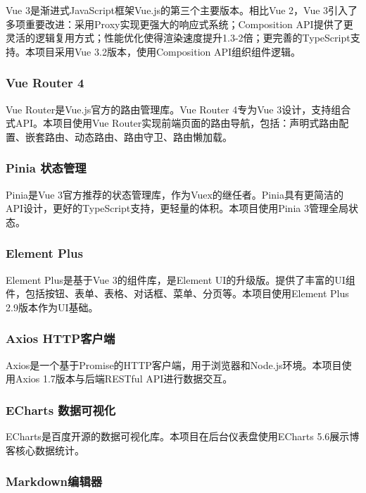 \documentclass[12pt,a4paper]{article}
\begin{document}
Vue 3是渐进式JavaScript框架Vue.js的第三个主要版本。相比Vue 2，Vue 3引入了多项重要改进：采用Proxy实现更强大的响应式系统；Composition API提供了更灵活的逻辑复用方式；性能优化使得渲染速度提升1.3-2倍；更完善的TypeScript支持。本项目采用Vue 3.2版本，使用Composition API组织组件逻辑。

\subsubsection{Vue Router 4}

Vue Router是Vue.js官方的路由管理库。Vue Router 4专为Vue 3设计，支持组合式API。本项目使用Vue Router实现前端页面的路由导航，包括：声明式路由配置、嵌套路由、动态路由、路由守卫、路由懒加载。

\subsubsection{Pinia 状态管理}

Pinia是Vue 3官方推荐的状态管理库，作为Vuex的继任者。Pinia具有更简洁的API设计，更好的TypeScript支持，更轻量的体积。本项目使用Pinia 3管理全局状态。

\subsubsection{Element Plus}

Element Plus是基于Vue 3的组件库，是Element UI的升级版。提供了丰富的UI组件，包括按钮、表单、表格、对话框、菜单、分页等。本项目使用Element Plus 2.9版本作为UI基础。

\subsubsection{Axios HTTP客户端}

Axios是一个基于Promise的HTTP客户端，用于浏览器和Node.js环境。本项目使用Axios 1.7版本与后端RESTful API进行数据交互。

\subsubsection{ECharts 数据可视化}

ECharts是百度开源的数据可视化库。本项目在后台仪表盘使用ECharts 5.6展示博客核心数据统计。

\subsubsection{Markdown编辑器}
\end{document}
